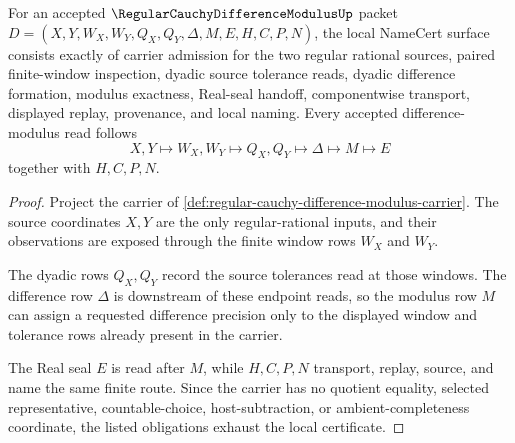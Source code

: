 \begin{theorem}
\label{thm:regular-cauchy-difference-modulus-obligations}
For an accepted $\RegularCauchyDifferenceModulusUp$ packet $D=(X,Y,W_X,W_Y,Q_X,Q_Y,\Delta,M,E,H,C,P,N)$, the local NameCert surface consists exactly of carrier admission for the two regular rational sources, paired finite-window inspection, dyadic source tolerance reads, dyadic difference formation, modulus exactness, Real-seal handoff, componentwise transport, displayed replay, provenance, and local naming. Every accepted difference-modulus read follows
$$
X,Y\longmapsto W_X,W_Y\longmapsto Q_X,Q_Y\longmapsto \Delta\longmapsto M\longmapsto E
$$
together with $H,C,P,N$.
\end{theorem}
\begin{proof}
Project the carrier of \autoref{def:regular-cauchy-difference-modulus-carrier}. The source coordinates $X,Y$ are the only regular-rational inputs, and their observations are exposed through the finite window rows $W_X$ and $W_Y$.

The dyadic rows $Q_X,Q_Y$ record the source tolerances read at those windows. The difference row $\Delta$ is downstream of these endpoint reads, so the modulus row $M$ can assign a requested difference precision only to the displayed window and tolerance rows already present in the carrier.

The Real seal $E$ is read after $M$, while $H,C,P,N$ transport, replay, source, and name the same finite route. Since the carrier has no quotient equality, selected representative, countable-choice, host-subtraction, or ambient-completeness coordinate, the listed obligations exhaust the local certificate.
\end{proof}

